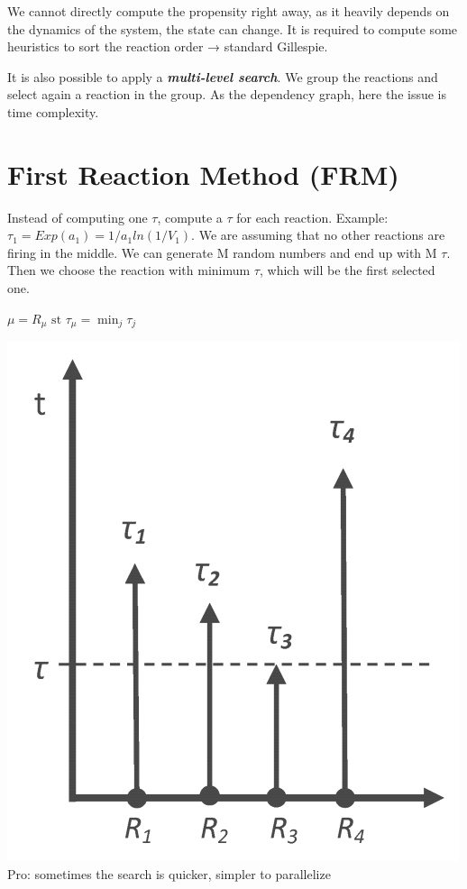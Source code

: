 We cannot directly compute the propensity right away, as it heavily
depends on the dynamics of the system, the state can change. It is
required to compute some heuristics to sort the reaction order →
standard Gillespie.

It is also possible to apply a \textbf{\emph{multi-level search}}. We
group the reactions and select again a reaction in the group. As the
dependency graph, here the issue is time complexity.

\hypertarget{first-reaction-method-frm}{%
\section{First Reaction Method (FRM)}\label{first-reaction-method-frm}}

Instead of computing one $\tau$, compute a $\tau$ for each reaction.
Example: $\tau_1 = Exp(a_1)=1/a_1ln(1/V_1)$. We are assuming that no
other reactions are firing in the middle. We can generate M random
numbers and end up with M $\tau$. Then we choose the reaction with
minimum $\tau$, which will be the first selected one.

$\mu= R_{\mu} \text{ st } \tau_{\mu} = \min_{j} \tau_j$

\includegraphics{03_images/R_tau.png} Pro: sometimes the search is
quicker, simpler to parallelize

